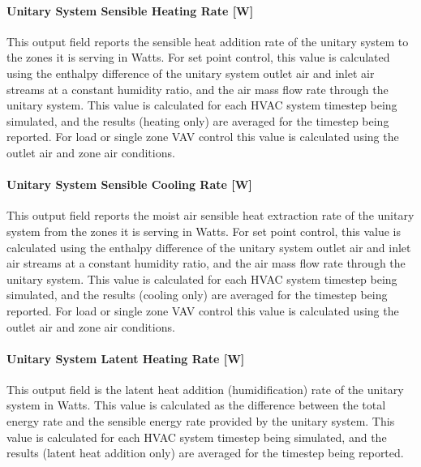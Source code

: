 \paragraph{Unitary System Sensible Heating Rate {[}W{]}}\label{unitary-system-sensible-heating-rate-w}

This output field reports the sensible heat addition rate of the unitary system to the zones it is serving in Watts. For set point control, this value is calculated using the enthalpy difference of the unitary system outlet air and inlet air streams at a constant humidity ratio, and the air mass flow rate through the unitary system. This value is calculated for each HVAC system timestep being simulated, and the results (heating only) are averaged for the timestep being reported. For load or single zone VAV control this value is calculated using the outlet air and zone air conditions.

\paragraph{Unitary System Sensible Cooling Rate {[}W{]}}\label{unitary-system-sensible-cooling-rate-w}

This output field reports the moist air sensible heat extraction rate of the unitary system from the zones it is serving in Watts. For set point control, this value is calculated using the enthalpy difference of the unitary system outlet air and inlet air streams at a constant humidity ratio, and the air mass flow rate through the unitary system. This value is calculated for each HVAC system timestep being simulated, and the results (cooling only) are averaged for the timestep being reported. For load or single zone VAV control this value is calculated using the outlet air and zone air conditions.

\paragraph{Unitary System Latent Heating Rate {[}W{]}}\label{unitary-system-latent-heating-rate-w}

This output field is the latent heat addition (humidification) rate of the unitary system in Watts. This value is calculated as the difference between the total energy rate and the sensible energy rate provided by the unitary system. This value is calculated for each HVAC system timestep being simulated, and the results (latent heat addition only) are averaged for the timestep being reported.

